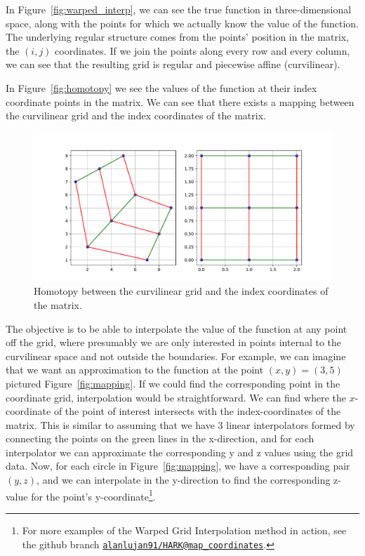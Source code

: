 \documentclass[\econtexRoot/SequentialEGM]{subfiles}
\begin{document}
In Figure~\ref{fig:warped_interp}, we can see the true function in three-dimensional space, along with the points for which we actually know the value of the function. The underlying regular structure comes from the points' position in the matrix, the $(i,j)$ coordinates. If we join the points along every row and every column, we can see that the resulting grid is regular and piecewise affine (curvilinear).

In Figure~\ref{fig:homotopy} we see the values of the function at their index coordinate points in the matrix. We can see that there exists a mapping between the curvilinear grid and the index coordinates of the matrix.

\begin{figure}
  \centering
  \includegraphics[width=0.8\linewidth]{Figures/Homotopy.pdf}
  \caption{Homotopy between the curvilinear grid and the index coordinates of the matrix.}
  \notinsubfile{\label{fig:homotopy}}
\end{figure}

The objective is to be able to interpolate the value of the function at any point off the grid, where presumably we are only interested in points internal to the curvilinear space and not outside the boundaries. For example, we can imagine that we want an approximation to the function at the point $(x,y) = (3, 5)$ pictured Figure~\ref{fig:mapping}. If we could find the corresponding point in the coordinate grid, interpolation would be straightforward. We can find where the $x$-coordinate of the point of interest intersects with the index-coordinates of the matrix. This is similar to assuming that we have 3 linear interpolators formed by connecting the points on the green lines in the x-direction, and for each interpolator we can approximate the corresponding y and z values using the grid data. Now, for each circle in Figure~\ref{fig:mapping}, we have a corresponding pair $(y,z)$, and we can interpolate in the y-direction to find the corresponding z-value for the point's y-coordinate\footnote{For more examples of the Warped Grid Interpolation method in action, see the github branch \href{https://github.com/alanlujan91/HARK/blob/map\_coordinates/examples/Interpolation/CurvilinearInterpolation.ipynb}{\texttt{alanlujan91/HARK@map\_coordinates}}.}.
\end{document}
